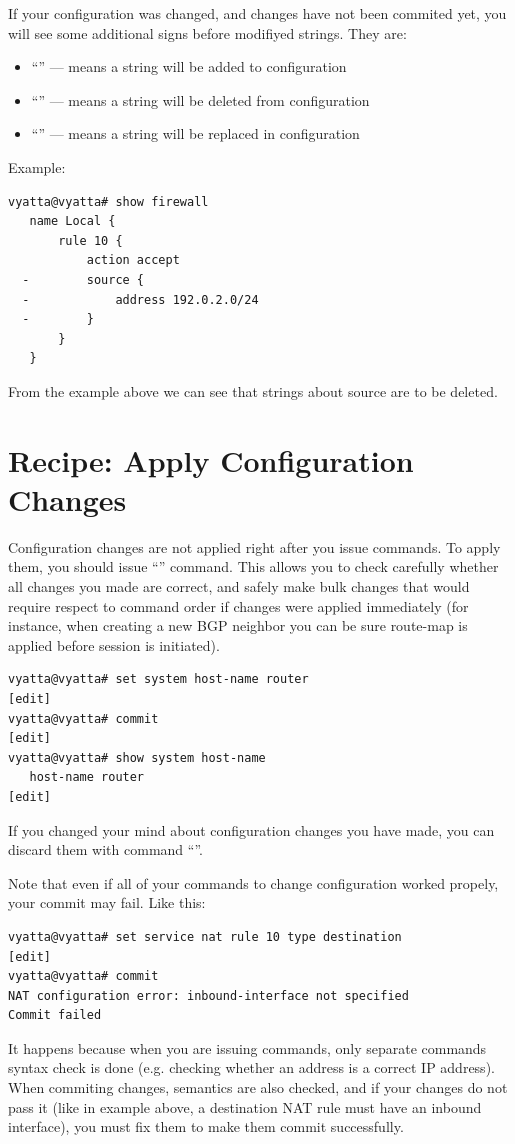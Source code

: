 \discussion
If your configuration was changed, and changes have not been commited yet, you will see some additional signs
before modifiyed strings. They are:
\begin{itemize}
 \item ``\console{+}'' --- means a string will be added to configuration
 \item ``\console{-}'' --- means a string will be deleted from configuration
 \item ``\console{>}'' --- means a string will be replaced in configuration
\end{itemize}
Example:
\begin{verbatim}
vyatta@vyatta# show firewall 
   name Local {
       rule 10 {
           action accept
  -        source {
  -            address 192.0.2.0/24
  -        }
       }
   }
\end{verbatim}
From the example above we can see that strings about source are to be deleted.

\section{Recipe: Apply Configuration Changes}
\solution
Configuration changes are not applied right after you issue commands. To apply them, you should issue 
``'' command. This allows you to check carefully whether all changes you made are correct, and
safely make bulk changes that would require respect to command order if changes were applied immediately
(for instance, when creating a new BGP neighbor you can be sure route-map is applied before session is initiated).
\begin{verbatim}
vyatta@vyatta# set system host-name router
[edit]
vyatta@vyatta# commit
[edit]
vyatta@vyatta# show system host-name 
   host-name router
[edit]
\end{verbatim}


If you changed your mind about configuration changes you have made, you can discard them with command 
``''.

\discussion
Note that even if all of your commands to change configuration worked propely, your commit may fail. Like this:
\begin{verbatim}
vyatta@vyatta# set service nat rule 10 type destination 
[edit]
vyatta@vyatta# commit
NAT configuration error: inbound-interface not specified
Commit failed
\end{verbatim}
It happens because when you are issuing commands, only separate commands syntax check is done (e.g. checking 
whether an address is a correct IP address). When commiting changes, semantics are also checked, and if your
changes do not pass it (like in example above, a destination NAT rule must have an inbound interface), you must
fix them to make them commit successfully.

